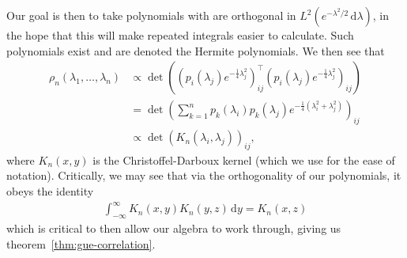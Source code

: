 \documentclass{tikzposter} %
\newcommand\diff{\mathrm{d}}
\begin{document}
\begin{columns}
{{      Our goal is then to take polynomials with are orthogonal in $L^2(e^{-\lambda^2/2} \, \diff \lambda)$, in the hope that this will make repeated integrals easier to calculate. Such polynomials exist and are denoted the Hermite polynomials. We then see that
      \begin{align*}
        \rho_n(\lambda_1, \dots, \lambda_n) &\propto \det \left((p_i(\lambda_j) e^{-\frac{1}{4}\lambda_j^2})^{\top}_{ij}(p_i(\lambda_j) e^{-\frac{1}{4}\lambda_j^2})_{ij}\right) \\
                                            &= \det \left(\sum_{k = 1}^{n} p_k(\lambda_i) p_k(\lambda_j) e^{-\frac{1}{4} (\lambda_i^2 + \lambda_j^2)}\right)_{ij} \\
        &\propto \det \left(K_n(\lambda_i, \lambda_j)\right)_{ij},
      \end{align*}
      where $K_n(x, y)$ is the Christoffel-Darboux kernel (which we use for the ease of notation). Critically, we may see that via the orthogonality of our polynomials, it obeys the identity
      \begin{align*}
        \int_{-\infty}^{\infty} K_n(x, y) K_n(y, z) \, \diff y = K_n(x, z)
      \end{align*}
      which is critical to then allow our algebra to work through, giving us theorem~\ref{thm:gue-correlation}.

    }

  }

\end{columns}
\end{document}
